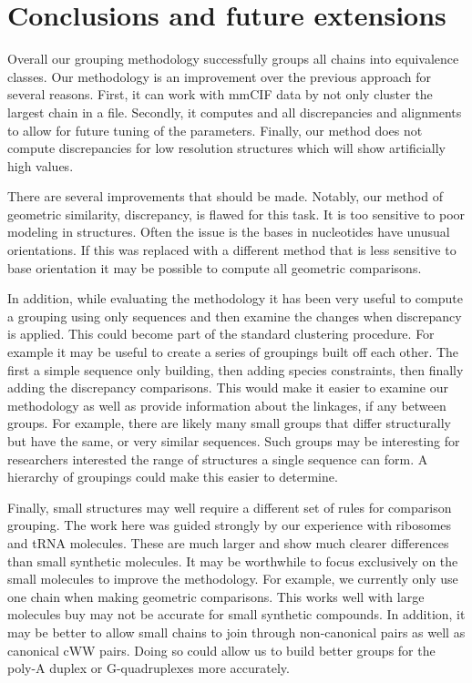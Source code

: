 \section{Conclusions and future extensions}

Overall our grouping methodology successfully groups all chains into equivalence
classes. Our methodology is an improvement over the previous approach for
several reasons. First, it can work with mmCIF data by not only cluster the
largest chain in a file. Secondly, it computes and all discrepancies and
alignments to allow for future tuning of the parameters. Finally, our method
does not compute discrepancies for low resolution structures which will show
artificially high values.

There are several improvements that should be made. Notably, our method of
geometric similarity, discrepancy, is flawed for this task. It is too sensitive
to poor modeling in structures. Often the issue is the bases in nucleotides have
unusual orientations. If this was replaced with a different method that is less
sensitive to base orientation it may be possible  to compute all geometric
comparisons. 

In addition, while evaluating the methodology it has been very useful to compute
a grouping using only sequences and then examine the changes when discrepancy is
applied. This could become part of the standard clustering procedure. For
example it may be useful to create a series of groupings built off each other.
The first a simple sequence only building, then adding species constraints, then
finally adding the discrepancy comparisons. This would make it easier to examine
our methodology as well as provide information about the linkages, if any
between groups. For example, there are likely many small groups that differ
structurally but have the same, or very similar sequences. Such groups may be
interesting for researchers interested the range of structures a single sequence
can form. A hierarchy of groupings could make this easier to determine. 

Finally, small structures may well require a different set of rules for
comparison grouping. The work here was guided strongly by our experience with
ribosomes and tRNA molecules. These are much larger and show much clearer
differences than small synthetic molecules. It may be worthwhile to focus
exclusively on the small molecules to improve the methodology. For example, we
currently only use one chain when making geometric comparisons. This works well
with large molecules buy may not be accurate for small synthetic compounds. In
addition, it may be better to allow small chains to join through non-canonical
pairs as well as canonical cWW pairs. Doing so could allow us to build better
groups for the poly-A duplex or G-quadruplexes more accurately. 
